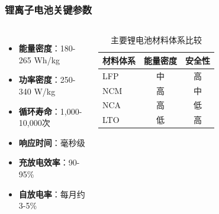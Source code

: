 \documentclass[aspectratio=169]{beamer}
\begin{document}
\begin{frame}
    \frametitle{锂离子电池关键参数}
    \begin{columns}
        \begin{itemize}
            \item \textbf{能量密度}：180-265 Wh/kg \cite{ref7}
            \item \textbf{功率密度}：250-340 W/kg \cite{ref7}
            \item \textbf{循环寿命}：1,000-10,000次 \cite{ref5}
            \item \textbf{响应时间}：毫秒级 \cite{ref4}
            \item \textbf{充放电效率}：90-95\% \cite{ref6}
            \item \textbf{自放电率}：每月约3-5\% \cite{ref7}
        \end{itemize}
        
        \begin{table}[h]
            \centering
            \begin{tabular}{lcc}
                \toprule
                \textbf{材料体系} & \textbf{能量密度} & \textbf{安全性} \\
                \midrule
                LFP & 中 & 高 \\
                NCM & 高 & 中 \\
                NCA & 高 & 低 \\
                LTO & 低 & 高 \\
                \bottomrule
            \end{tabular}
            \caption{主要锂电池材料体系比较}
        \end{table}
    \end{columns}
\end{frame}
\end{document}
